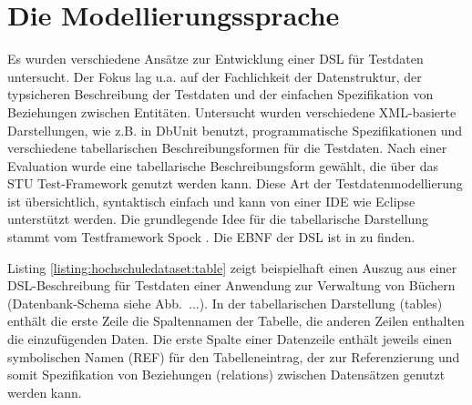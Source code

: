 \section{Die Modellierungssprache}


%
%

Es wurden verschiedene Ansätze zur Entwicklung einer DSL für Testdaten untersucht. Der Fokus lag u.a. auf der Fachlichkeit der Datenstruktur, der typsicheren Beschreibung der Testdaten und der einfachen Spezifikation von Beziehungen zwischen Entitäten. Untersucht wurden verschiedene XML-basierte Darstellungen, wie z.B. in DbUnit benutzt, programmatische Spezifikationen und verschiedene tabellarischen Beschreibungsformen für die Testdaten. 
%
Nach einer Evaluation wurde eine tabellarische Beschreibungsform gewählt, die über das STU Test-Framework genutzt werden kann. Diese Art der Testdatenmodellierung ist übersichtlich, syntaktisch einfach und kann von einer IDE wie Eclipse unterstützt werden. Die grundlegende Idee für die tabellarische Darstellung stammt vom Testframework Spock \cite{Spock}.
%
Die EBNF der DSL ist in \cite{MT:Moll:2013} zu finden.


Listing \ref{listing:hochschuledataset:table} zeigt beispielhaft einen Auszug aus einer DSL-Beschreibung für Testdaten einer Anwendung zur Verwaltung von Büchern (Datenbank-Schema siehe Abb.~...). In der tabellarischen Darstellung (tables) enthält die erste Zeile die Spaltennamen der Tabelle, die anderen Zeilen enthalten die einzufügenden Daten. Die erste Spalte einer Datenzeile enthält jeweils einen symbolischen Namen (REF) für den Tabelleneintrag, der zur Referenzierung und somit Spezifikation von Beziehungen (relations) zwischen Datensätzen genutzt werden kann.


